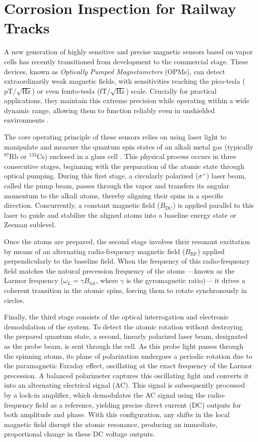 \FloatBarrier
\section{Corrosion Inspection for Railway Tracks}
\label{sec:opm}
A new generation of highly sensitive and precise magnetic sensors based on 
vapor cells has recently transitioned from development to the commercial 
stage. These devices, known as \textit{Optically Pumped Magnetometers} (OPMs), 
can detect extraordinarily weak magnetic fields, with sensitivities reaching 
the pico-tesla ($\mathrm{pT}/\sqrt{\mathrm{Hz}}$) or even femto-tesla 
($\mathrm{fT}/\sqrt{\mathrm{Hz}}$) scale. Crucially for practical applications, 
they maintain this extreme precision while operating within a wide dynamic range, 
allowing them to function reliably even in unshielded environments \cite{quspin, deans2021}.

The core operating principle of these sensors relies on using laser light to 
manipulate and measure the quantum spin states of an alkali metal gas 
(typically $^{87}\mathrm{Rb}$ or $^{133}\mathrm{Cs}$) enclosed in a glass 
cell \cite{tierney2019}. This physical process occurs in three consecutive 
stages, beginning with the preparation of the atomic state through optical 
pumping. During this first stage, a circularly polarized ($\sigma^+$) laser 
beam, called the pump beam, passes through the vapor and transfers its angular 
momentum to the alkali atoms, thereby aligning their spins in a specific 
direction. Concurrently, a constant magnetic field ($B_{\mathrm{DC}}$) is 
applied parallel to this laser to guide and stabilize the aligned atoms into a 
baseline energy state or Zeeman sublevel.

Once the atoms are prepared, the second stage involves their resonant 
excitation by means of an alternating radio-frequency magnetic field 
($B_{\mathrm{RF}}$) applied perpendicularly to the baseline field. When 
the frequency of this radio-frequency field matches the natural precession 
frequency of the atoms ---known as the Larmor frequency ($\omega_L = \gamma B_{\mathrm{tot}}$, 
where $\gamma$ is the gyromagnetic ratio)--- it drives a coherent transition in 
the atomic spins, forcing them to rotate synchronously in circles. 

Finally, the third stage consists of the optical interrogation and electronic 
demodulation of the system. To detect the atomic rotation without destroying 
the prepared quantum state, a second, linearly polarized laser beam, designated 
as the probe beam, is sent through the cell. As this probe light passes through 
the spinning atoms, its plane of polarization undergoes a periodic rotation due 
to the paramagnetic Faraday effect, oscillating at the exact frequency of the 
Larmor precession. A balanced polarimeter captures this oscillating light and 
converts it into an alternating electrical signal (AC). This signal is subsequently 
processed by a lock-in amplifier, which demodulates the AC signal using the 
radio-frequency field as a reference, yielding precise direct current (DC) outputs 
for both amplitude and phase. With this configuration, any shifts in the local magnetic 
field disrupt the atomic resonance, producing an immediate, proportional change 
in these DC voltage outputs.

